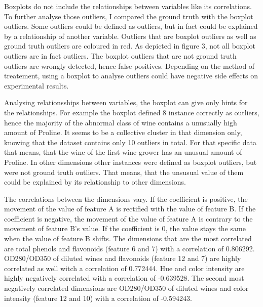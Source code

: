 Boxplots do not include the relationships between variables like its correlations.
To further analyse those outliers, I compared the ground truth with the boxplot outliers.
Some outliers could be defined as outliers, but in fact could be explained by a relationship of another variable. 
Outliers that are boxplot outliers as well as ground truth outliers are coloured in red.
As depicted in figure 3, not all boxplot outliers are in fact outliers.
The boxplot outliers that are not ground truth outliers are wrongly detected, hence false positives.
Depending on the method of treatement, using a boxplot to analyse outliers could have negative side effects on experimental results.


Analysing relationsships between variables, the boxplot can give only hints for the relationships.
For example the boxplot defined 8 instance correctly as outliers, hence the majority of the abnormal class of wine contains a unusually high amount of Proline.
It seems to be a collective cluster in that dimension only, knowing that the dataset contains only 10 outliers in total. 
For that specific data that means, that the wine of the first wine grower has an unusual amount of Proline.
In other dimensions other instances were defined as boxplot outliers, but were not ground truth outliers. 
That means, that the unsusual value of them could be explained by its relationship to other dimensions. 




The correlations between the dimensions vary.
If the coefficient is positive, the movement of the value of feature A is rectified with the value of feature B.
If the coefficient is negative, the movement of the value of feature A is contrary to the movement of feature B's value.
If the coefficient is 0, the value stays the same when the value of feature B shifts.
The dimensions that are the most correlated are total phenols and flavonoids (feature 6 and 7) with a correlation of 0.806292.
OD280/OD350 of diluted wines and flavonoids (feature 12 and 7) are highly correlated as well witch a correlation of 0.772444.
Hue and color intensity are highly negatively correlated with a correlation of -0.639528.
The second most negatively correlated dimensions are OD280/OD350 of diluted wines and color intensity (feature 12 and 10) with a correlation of -0.594243.


